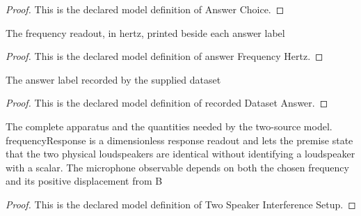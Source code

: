 \begin{proof}
  This is the declared model definition of Answer Choice.
\end{proof}
\begin{definition}
  \label{def:physics:phyx-mini-0173:phyxminiproblems-problemphyxmini0173-answerfrequencyhertz}
  The frequency readout, in hertz, printed beside each answer label
\end{definition}
\begin{proof}
  This is the declared model definition of answer Frequency Hertz.
\end{proof}
\begin{definition}
  \label{def:physics:phyx-mini-0173:phyxminiproblems-problemphyxmini0173-recordeddatasetanswer}
  The answer label recorded by the supplied dataset
\end{definition}
\begin{proof}
  This is the declared model definition of recorded Dataset Answer.
\end{proof}
\begin{definition}
  \label{def:physics:phyx-mini-0173:phyxminiproblems-problemphyxmini0173-twospeakerinterferencesetup}
  The complete apparatus and the quantities needed by the two-source model. frequencyResponse is a dimensionless response readout and lets the premise state that the two physical loudspeakers are identical without identifying a loudspeaker with a scalar. The microphone observable depends on both the chosen frequency and its positive displacement from B
\end{definition}
\begin{proof}
  This is the declared model definition of Two Speaker Interference Setup.
\end{proof}
